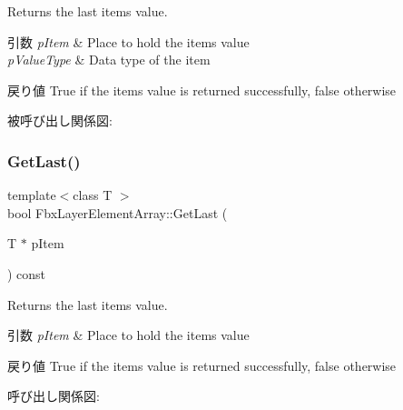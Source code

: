 Returns the last item\textquotesingle{}s value. 
\begin{DoxyParams}{引数}
{\em p\+Item} & Place to hold the item\textquotesingle{}s value \\
\hline
{\em p\+Value\+Type} & Data type of the item \\
\hline
\end{DoxyParams}
\begin{DoxyReturn}{戻り値}
{\ttfamily True} if the item\textquotesingle{}s value is returned successfully, {\ttfamily false} otherwise 
\end{DoxyReturn}
被呼び出し関係図\+:
\mbox{\label{class_fbx_layer_element_array_a151426ccb1c4c28550c637716fdb7b64}} 
\subsubsection{\texorpdfstring{Get\+Last()}{GetLast()}\hspace{0.1cm}{\footnotesize\ttfamily [2/2]}}
{\footnotesize\ttfamily template$<$class T $>$ \\
bool Fbx\+Layer\+Element\+Array\+::\+Get\+Last (\begin{DoxyParamCaption}\item[{T $\ast$}]{p\+Item }\end{DoxyParamCaption}) const}

Returns the last item\textquotesingle{}s value. 
\begin{DoxyParams}{引数}
{\em p\+Item} & Place to hold the item\textquotesingle{}s value \\
\hline
\end{DoxyParams}
\begin{DoxyReturn}{戻り値}
{\ttfamily True} if the item\textquotesingle{}s value is returned successfully, {\ttfamily false} otherwise 
\end{DoxyReturn}
呼び出し関係図\+:
\mbox{\label{class_fbx_layer_element_array_a34ac50b866b0615109329c114e612b83}} 
